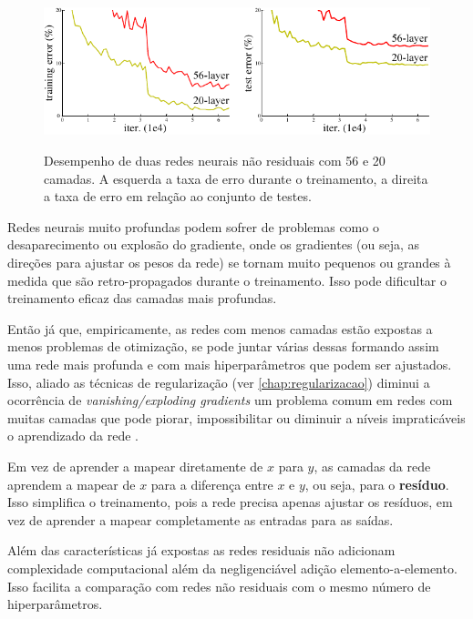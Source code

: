 			\begin{figure}[H]
				\centering
				\caption[Comparação de redes profundas não residuais]{Desempenho de duas redes neurais não residuais com 56 e 20 camadas. A esquerda a taxa de erro durante o treinamento, a direita a taxa de erro em relação ao conjunto de testes.}
				\includegraphics[width=0.7\linewidth]{images/teaser}
				\label{fig:teaser}
			\end{figure}
			
			\par Redes neurais muito profundas podem sofrer de problemas como o desaparecimento ou explosão do gradiente, onde os gradientes (ou seja, as direções para ajustar os pesos da rede) se tornam muito pequenos ou grandes à medida que são retro-propagados durante o treinamento. Isso pode dificultar o treinamento eficaz das camadas mais profundas.

			\par Então já que, empiricamente, as redes com menos camadas estão expostas a menos problemas de otimização, se pode juntar várias dessas formando assim uma rede mais profunda e com mais hiperparâmetros que podem ser ajustados. Isso, aliado as técnicas de regularização (ver \autoref{chap:regularizacao}) diminui a ocorrência de \textit{vanishing/exploding gradients} um problema comum em redes com muitas camadas que pode piorar, impossibilitar ou diminuir a níveis impraticáveis o aprendizado da rede \cite{DBLP:journals/corr/HeZRS15}. 
			
			\par Em vez de aprender a mapear diretamente de $x$ para $y$, as camadas da rede aprendem a mapear de $x$ para a diferença entre $x$ e $y$, ou seja, para o \textbf{resíduo}. Isso simplifica o treinamento, pois a rede precisa apenas ajustar os resíduos, em vez de aprender a mapear completamente as entradas para as saídas.
			
			\par Além das características já expostas as redes residuais não adicionam complexidade computacional além da negligenciável adição elemento-a-elemento. Isso facilita a comparação com redes não residuais com o mesmo número de hiperparâmetros.
			
